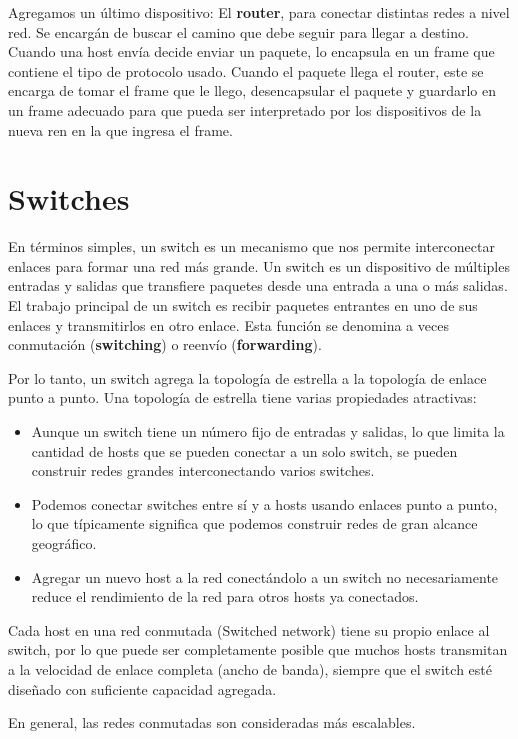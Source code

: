 Agregamos un último dispositivo: El \textbf{router}, para conectar distintas redes a nivel red. Se encargán de buscar el camino que debe seguir para llegar a destino. Cuando una host envía decide enviar un paquete, lo encapsula en un frame que contiene el tipo de protocolo usado. Cuando el paquete llega el router, este se encarga de tomar el frame que le llego, desencapsular el paquete y guardarlo en un frame adecuado para que pueda ser interpretado por los dispositivos de la nueva ren en la que ingresa el frame.

\section{Switches}
En términos simples, un switch es un mecanismo que nos permite interconectar enlaces para formar una red más grande. Un switch es un dispositivo de múltiples entradas y salidas que transfiere paquetes desde una entrada a una o más salidas. El trabajo principal de un switch es recibir paquetes entrantes en uno de sus enlaces y transmitirlos en otro enlace. Esta función se denomina a veces conmutación (\textbf{switching}) o reenvío (\textbf{forwarding}).

Por lo tanto, un switch agrega la topología de estrella a la topología de enlace punto a punto. Una topología de estrella tiene varias propiedades atractivas:

\begin{itemize}
  \item Aunque un switch tiene un número fijo de entradas y salidas, lo que limita la cantidad de hosts que se pueden conectar a un solo switch, se pueden construir redes grandes interconectando varios switches.
  \item Podemos conectar switches entre sí y a hosts usando enlaces punto a punto, lo que típicamente significa que podemos construir redes de gran alcance geográfico.
  \item Agregar un nuevo host a la red conectándolo a un switch no necesariamente reduce el rendimiento de la red para otros hosts ya conectados.
\end{itemize}

Cada host en una red conmutada (Switched network) tiene su propio enlace al switch, por lo que puede ser completamente
posible que muchos hosts transmitan a la velocidad de enlace completa (ancho de banda),
siempre que el switch esté diseñado con suficiente capacidad agregada.

En general, las redes conmutadas son consideradas más escalables. 

